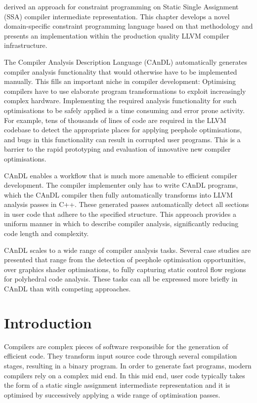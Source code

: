 
     derived an approach for constraint programming on
    Static Single Assignment (SSA) compiler intermediate representation.
    This chapter develops a novel domain-specific constraint programming
    language based on that methodology and presents an implementation within the
    production quality LLVM compiler infrastructure.

    The Compiler Analysis Description Language (CAnDL) automatically generates
    compiler analysis functionality that would otherwise have to be implemented
    manually.
    This fills an important niche in compiler development:
    Optimising compilers have to use elaborate program transformations to exploit
    increasingly complex hardware.
    Implementing the required analysis functionality for such optimisations to
    be safely applied is a time consuming and error prone activity.
    For example, tens of thousands of lines of code are required in the LLVM
    codebase to detect the appropriate places for applying peephole
    optimisations, and bugs in this functionality can result in corrupted user
    programs.
    This is a barrier to the rapid prototyping and evaluation of innovative new
    compiler optimisations.

    CAnDL enables a workflow that is much more amenable to efficient compiler
    development.
    The compiler implementer only has to write CAnDL programs, which the CAnDL
    compiler then fully automatically transforms into LLVM analysis passes in
    C++.
    These generated passes automatically detect all sections in user code that
    adhere to the specified structure.
    This approach provides a uniform manner in which to describe compiler
    analysis, significantly reducing code length and complexity.

    CAnDL scales to a wide range of compiler analysis tasks.
    Several case studies are presented that range from the detection of
    peephole optimisation opportunities, over graphics shader optimisations,
    to fully capturing static control flow regions for polyhedral code analysis.
    These tasks can all be expressed more briefly in CAnDL than with competing
    approaches.

\section{Introduction}

    Compilers are complex pieces of software responsible for the generation of
    efficient code.
    They transform input source code through several compilation stages,
    resulting in a binary program.
    In order to generate fast programs, modern compilers rely on a complex mid
    end.
    In this mid end, user code typically takes the form of a static single
    assignment intermediate representation and it is optimised by successively
    applying a wide range of optimisation passes.


